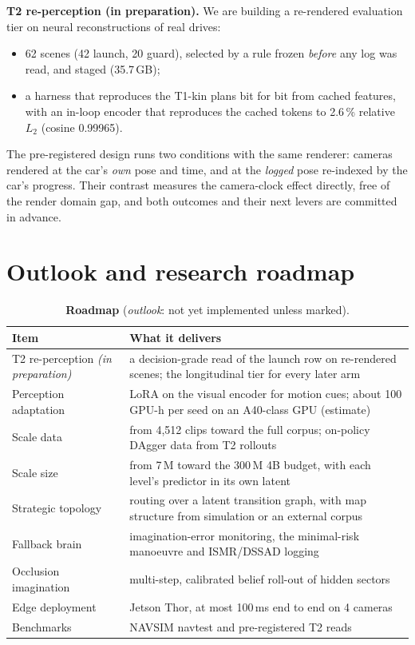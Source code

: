\documentclass[10pt,twocolumn]{article}
\theoremstyle{remark}
\begin{document}
\textbf{T2 re-perception (in preparation).} We are building a re-rendered evaluation tier on neural reconstructions of real drives:
\begin{itemize}
  \item 62 scenes (42 launch, 20 guard), selected by a rule frozen \emph{before} any log was read, and staged (35.7\,GB);
  \item a harness that reproduces the T1-kin plans bit for bit from cached features, with an in-loop encoder that reproduces the
        cached tokens to 2.6\,\% relative $L_2$ (cosine 0.99965).
\end{itemize}
The pre-registered design runs two conditions with the same renderer: cameras rendered at the car's \emph{own} pose and time, and at
the \emph{logged} pose re-indexed by the car's progress. Their contrast measures the camera-clock effect directly, free of the
render domain gap, and both outcomes and their next levers are committed in advance.

\section{Outlook and research roadmap}\label{sec:outlook}
\begin{table}[t]
\centering
\caption{\textbf{Roadmap} (\emph{outlook}: not yet implemented unless marked).}
\label{tab:roadmap}
\small
\begin{tabularx}{\columnwidth}{@{}>{\raggedright\arraybackslash}p{24mm}>{\raggedright\arraybackslash}X@{}}
\toprule
Item & What it delivers \\
\midrule
T2 re-perception \textit{(in preparation)} & a decision-grade read of the launch row on re-rendered scenes; the longitudinal tier for every later arm \\
Perception adaptation & LoRA on the visual encoder for motion cues; about 100 GPU-h per seed on an A40-class GPU (estimate) \\
Scale data & from 4,512 clips toward the full corpus; on-policy DAgger data from T2 rollouts \\
Scale size & from 7\,M toward the 300\,M 4B budget, with each level's predictor in its own latent \\
Strategic topology & routing over a latent transition graph, with map structure from simulation or an external corpus \\
Fallback brain & imagination-error monitoring, the minimal-risk manoeuvre and ISMR/DSSAD logging \\
Occlusion imagination & multi-step, calibrated belief roll-out of hidden sectors \\
Edge deployment & Jetson Thor, at most 100\,ms end to end on 4 cameras \\
Benchmarks & NAVSIM navtest and pre-registered T2 reads \\
\bottomrule
\end{tabularx}
\end{table}
\end{document}
